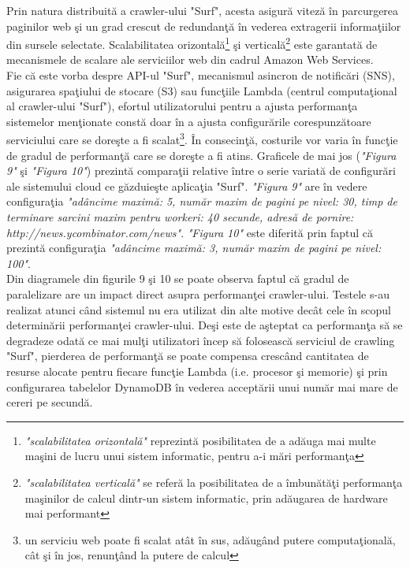 Prin natura distribuită a crawler-ului "Surf", acesta asigură viteză în parcurgerea paginilor web şi un grad crescut de redundanţă în vederea extragerii informaţiilor din sursele selectate. Scalabilitatea orizontală\footnote{\textit{"scalabilitatea orizontală"} reprezintă posibilitatea de a adăuga mai multe maşini de lucru unui sistem informatic, pentru a-i mări performanţa} şi verticală\footnote{\textit{"scalabilitatea verticală"} se referă la posibilitatea de a îmbunătăţi performanţa maşinilor de calcul dintr-un sistem informatic, prin adăugarea de hardware mai performant} este garantată de mecanismele de scalare ale serviciilor web din cadrul Amazon Web Services.
\\ 

\noindent
Fie că este vorba despre API-ul "Surf", mecanismul asincron de notificări (SNS), asigurarea spaţiului de stocare (S3) sau funcţiile Lambda (centrul computaţional al crawler-ului "Surf"), efortul utilizatorului pentru a ajusta performanţa sistemelor menţionate constă doar în a ajusta configurările corespunzătoare serviciului care se doreşte a fi scalat\footnote{un serviciu web poate fi scalat atât în sus, adăugând putere computaţională, cât şi în jos, renunţând la putere de calcul}. În consecinţă, costurile vor varia în funcţie de gradul de performanţă care se doreşte a fi atins. Graficele de mai jos (\textit{"Figura 9"} şi \textit{"Figura 10"}) prezintă comparaţii relative între o serie variată de configurări ale sistemului cloud ce găzduieşte aplicaţia "Surf". \textit{"Figura 9"} are în vedere configuraţia \textit{"adâncime maximă: 5, număr maxim de pagini pe nivel: 30, timp de terminare sarcini maxim pentru workeri: 40 secunde, adresă de pornire: http://news.ycombinator.com/news"}. \textit{"Figura 10"} este diferită prin faptul că prezintă configuraţia \textit{"adâncime maximă: 3, număr maxim de pagini pe nivel: 100"}.
\\

\noindent
Din diagramele din figurile 9 şi 10 se poate observa faptul că gradul de paralelizare are un impact direct asupra performanţei crawler-ului. Testele s-au realizat atunci când sistemul nu era utilizat din alte motive decât cele în scopul determinării performanţei crawler-ului. Deşi este de aşteptat ca performanţa să se degradeze odată ce mai mulţi utilizatori încep să folosească serviciul de crawling "Surf", pierderea de performanţă se poate compensa crescând cantitatea de resurse alocate pentru fiecare funcţie Lambda (i.e. procesor şi memorie) şi prin configurarea tabelelor DynamoDB în vederea acceptării unui număr mai mare de cereri pe secundă.

